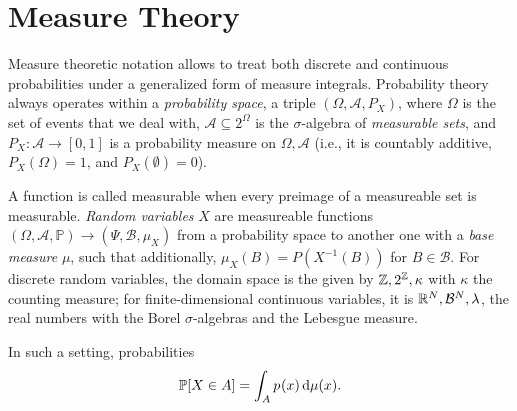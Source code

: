 \chapter{Measure Theory}
\label{ch:measure-theory}

Measure theoretic notation \parencite{kallenberg2006foundations} allows to treat both discrete and
continuous probabilities under a generalized form of measure integrals.  Probability theory always
operates within a \emph{probability space}, a triple \((\Omega, \mathcal{A}, P_X)\), where
\(\Omega\) is the set of events that we deal with, \(\mathcal{A} \subseteq 2^{\Omega}\) is the
\(\sigma\)-algebra of \emph{measurable sets}, and \(P_X: \mathcal{A} \to [0, 1]\) is a probability
measure on \(\Omega, \mathcal{A}\) (i.e., it is countably additive, \(P_X(\Omega) = 1\), and
\(P_X(\emptyset) = 0\)).

A function is called measurable when every preimage of a measureable set is measurable. \emph{Random
  variables} \(X\) are measureable functions
\((\Omega, \mathcal{A}, \mathbb{P}) \to (\Psi, \mathcal{B}, \mu_X)\) from a probability space to another
one with a \emph{base measure} \(\mu\), such that additionally, \(\mu_X(B) = P(X^{-1}(B))\) for
\(B \in \mathcal{B}\).  For discrete random variables, the domain space is the given by
\(\mathbb{Z}, 2^{\mathbb{Z}}, \kappa\) with \(\kappa\) the counting measure; for finite-dimensional continuous
variables, it is \(\mathbb{R}^N, \mathcal{B}^N, \lambda\), the real numbers with the Borel
\(\sigma\)-algebras and the Lebesgue measure.

In such a setting, probabilities
\begin{equation}
  \label{eq:measure-integral}
  \Prob{X \in A} = \int_{A} \prob{x} \dif\mu(x).
\end{equation}



